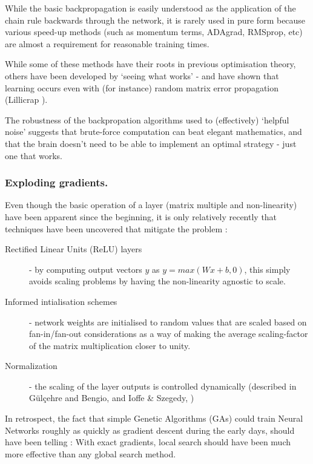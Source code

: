 \documentclass[citeauthoryear]{llncs}
\begin{document}
While the basic backpropagation is easily understood as the application 
of the chain rule backwards through the network, it is rarely used in pure form
because various speed-up methods (such as momentum terms, ADAgrad, RMSprop, etc)
are almost a requirement for reasonable training times.  

While some of these methods have their roots in previous optimisation theory, 
others have been developed by `seeing what works' - and have shown that 
learning occurs even with (for instance) random matrix error propagation 
(Lillicrap \cite{Lillicrap-random-matrix}).

The robustness of the backpropation algorithms used to (effectively) `helpful noise'
suggests that brute-force computation can beat elegant mathematics, and that 
the brain doesn't need to be able to implement an optimal strategy - just one that works.


\subsubsection*{Exploding gradients.}

Even though the basic operation of a layer (matrix multiple and non-linearity) 
have been apparent since the beginning, it is only relatively recently that 
techniques have been uncovered that mitigate the problem : 
\begin{description}
\item[Rectified Linear Units (ReLU) layers] - by computing output vectors $y$ 
as $y=max(Wx+b, 0)$, this simply avoids scaling problems by having the non-linearity agnostic to scale.
\item[Informed intialisation schemes] - network weights are initialised 
to random values that are scaled based on fan-in/fan-out considerations as a way of making the 
average scaling-factor of the matrix multiplication closer to unity.
\item[Normalization] - the scaling of the layer outputs is controlled
dynamically (described in G{\"u}l{\c{c}}ehre and Bengio, \cite{bengio-whitening} and 
Ioffe \& Szegedy, \cite{WhiteningOfData})
\end{description}

In retrospect, the fact that simple Genetic Algorithms (GAs) could train 
Neural Networks roughly as quickly as gradient descent during the early days, 
should have been telling : With exact gradients, local search should have 
been much more effective than any global search method.
\end{document}
